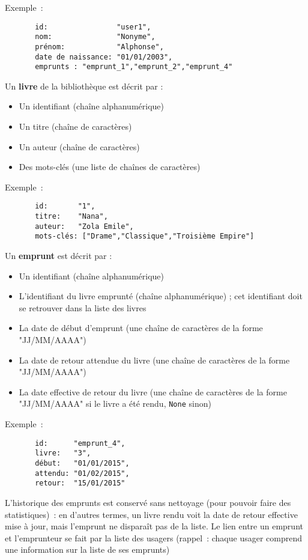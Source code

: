 \documentclass[10pt,a4paper]{sujets-exercices}
\begin{document}
Exemple~:
{\small
\begin{verbatim}
       id:                "user1", 
       nom:               "Nonyme", 
       prénom:            "Alphonse", 
       date de naissance: "01/01/2003", 
       emprunts : "emprunt_1","emprunt_2","emprunt_4"
\end{verbatim}
}


Un \textbf{livre} de la bibliothèque est décrit par : 

\begin{itemize}
\item Un identifiant (chaîne alphanumérique)
\item Un titre (chaîne de caractères)
\item Un auteur (chaîne de caractères)
\item Des mots-clés (une liste de chaînes de caractères)
\end{itemize}

Exemple~:
{\small
\begin{verbatim}
       id:       "1",
       titre:    "Nana",
       auteur:   "Zola Emile",
       mots-clés: ["Drame","Classique","Troisième Empire"]
\end{verbatim}
}

Un \textbf{emprunt} est décrit par :

\begin{itemize}
\item Un identifiant (chaîne alphanumérique)
\item L'identifiant du livre emprunté (chaîne alphanumérique) ; cet identifiant doit se retrouver dans la liste des livres
\item La date de début d'emprunt (une chaîne de caractères de la forme "JJ/MM/AAAA")
\item La date de retour attendue du livre (une chaîne de caractères de la forme "JJ/MM/AAAA")
\item La date effective de retour du livre (une chaîne de caractères de la forme "JJ/MM/AAAA" si le livre a été rendu, \texttt{None} sinon)
\end{itemize}

Exemple~:
{\small
\begin{verbatim}
       id:      "emprunt_4",
       livre:   "3",
       début:   "01/01/2015",
       attendu: "01/02/2015",
       retour:  "15/01/2015"
\end{verbatim}
}

L'historique des emprunts est conservé sans nettoyage (pour pouvoir faire des statistiques)~: en d'autres termes, un livre rendu voit la date de retour effective mise à jour, mais l'emprunt ne disparaît pas de la liste. Le lien entre un emprunt et l'emprunteur se fait par la liste des usagers (rappel~: chaque usager comprend une information sur la liste de ses emprunts)
\end{document}
